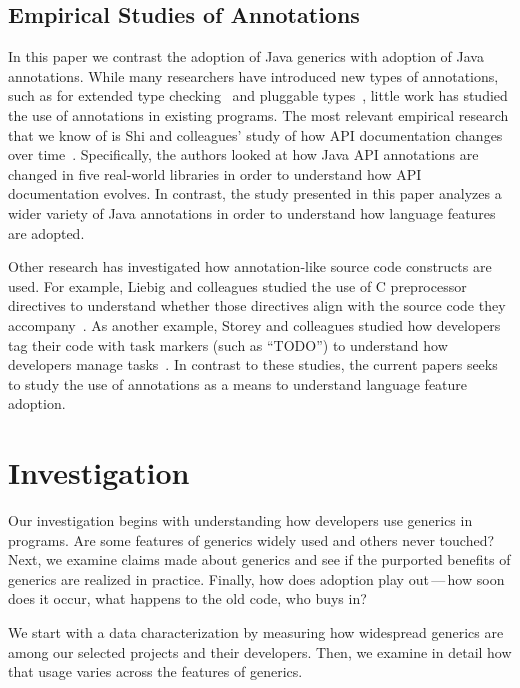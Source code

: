 \documentclass{svjour3}
\begin{document}
\subsection{Empirical Studies of Annotations}

In this paper we contrast the adoption of Java generics with adoption
of Java annotations.
While many researchers have introduced new types of annotations, such
as for extended type checking~\cite{flanagan} 
and pluggable types~\cite{papi},
little work has studied the use of annotations in existing programs.
The most relevant empirical research that we know 
of is Shi and colleagues' study of how API documentation 
changes over time~\cite{shi}.
Specifically, the authors looked at how Java API annotations are changed in
five real-world libraries in order to understand
how API documentation evolves.
In contrast, the study presented in this paper
analyzes a wider variety of Java annotations
in order to understand how language features are adopted.

Other research has investigated how annotation-like source
code constructs are used.
For example, Liebig and colleagues studied the use of C
preprocessor directives to understand whether those
directives align with the source code they accompany~\cite{liebig}.
As another example, Storey and colleagues studied how developers
tag their code with task markers (such as ``TODO'')
to understand how developers manage tasks~\cite{storey}.
In contrast to these studies, the current papers seeks to 
study the use of annotations as a means to understand 
language feature adoption.


\section{Investigation}\label{sec:investigation}

Our investigation begins with understanding how developers use generics in
programs.
Are some features of generics widely used and others never touched?
Next, we examine claims made about generics and see if the purported benefits of generics are realized in practice.
Finally, how does adoption play out\,---\,how soon does it occur, what happens to the old code, who buys in?


We start with a data characterization by measuring how widespread generics are
among our selected projects and their developers.  Then, we examine in detail
how that usage varies across the features of generics.
\end{document}
